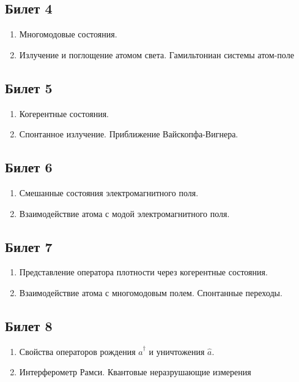 \documentclass[12pt,a4paper]{article}
\begin{document}
\subsection*{Билет 4} 
\begin{enumerate}
\item Многомодовые состояния. 
\item Излучение и поглощение атомом света. 
Гамильтониан системы атом-поле
\end{enumerate}

\subsection*{Билет 5} 
\begin{enumerate}
\item Когерентные состояния. 
\item Спонтанное излучение. Приближение Вайскопфа-Вигнера.
\end{enumerate}

\subsection*{Билет 6} 
\begin{enumerate}
\item Смешанные состояния электромагнитного поля. 
\item Взаимодействие
атома с модой электромагнитного поля. 
\end{enumerate}

\subsection*{Билет 7} 
\begin{enumerate}
\item Представление оператора плотности через когерентные
  состояния.
\item Взаимодействие атома с многомодовым полем. Спонтанные переходы.
\end{enumerate}

\subsection*{Билет 8} 
\begin{enumerate}
\item Свойства операторов рождения $\hat{a}^\dag$ и уничтожения $\hat{a}$.
\item Интерферометр Рамси. Квантовые неразрушающие измерения
\end{enumerate}
\end{document}
